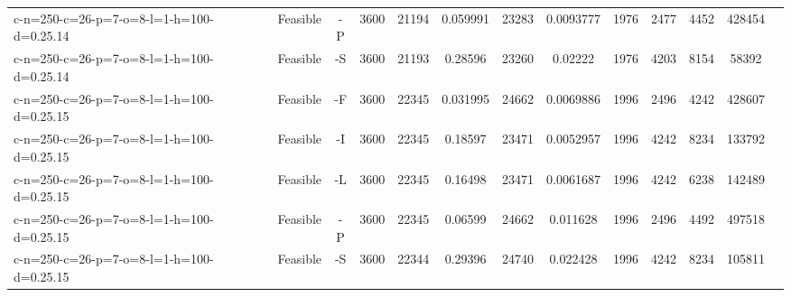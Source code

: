 \documentclass[landscape, a4paper]{article}
\begin{document}
\begin{center}
\begin{tabular}{lcccccccccccc}
c-n=250-c=26-p=7-o=8-l=1-h=100-d=0.25.14 & Feasible & -P & 3600 & 21194 & 0.059991 & 23283 & 0.0093777 & 1976 & 2477 & 4452 & 428454 & \\
c-n=250-c=26-p=7-o=8-l=1-h=100-d=0.25.14 & Feasible & -S & 3600 & 21193 & 0.28596 & 23260 & 0.02222 & 1976 & 4203 & 8154 & 58392 & \\
c-n=250-c=26-p=7-o=8-l=1-h=100-d=0.25.15 & Feasible & -F & 3600 & 22345 & 0.031995 & 24662 & 0.0069886 & 1996 & 2496 & 4242 & 428607 & \\
c-n=250-c=26-p=7-o=8-l=1-h=100-d=0.25.15 & Feasible & -I & 3600 & 22345 & 0.18597 & 23471 & 0.0052957 & 1996 & 4242 & 8234 & 133792 & \\
c-n=250-c=26-p=7-o=8-l=1-h=100-d=0.25.15 & Feasible & -L & 3600 & 22345 & 0.16498 & 23471 & 0.0061687 & 1996 & 4242 & 6238 & 142489 & \\
c-n=250-c=26-p=7-o=8-l=1-h=100-d=0.25.15 & Feasible & -P & 3600 & 22345 & 0.06599 & 24662 & 0.011628 & 1996 & 2496 & 4492 & 497518 & \\
c-n=250-c=26-p=7-o=8-l=1-h=100-d=0.25.15 & Feasible & -S & 3600 & 22344 & 0.29396 & 24740 & 0.022428 & 1996 & 4242 & 8234 & 105811 & \\
\end{tabular}
\end{center}
\end{document}
